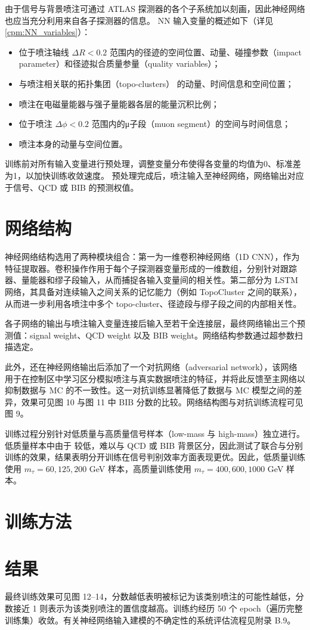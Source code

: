 由于信号与背景喷注可通过 ATLAS 探测器的各个子系统加以刻画，因此神经网络也应当充分利用来自各子探测器的信息。
NN 输入变量的概述如下（详见\autoref{cpm:NN_variables}）：
\begin{itemize}
    \item 位于喷注轴线 $\Delta R < 0.2$ 范围内的径迹的空间位置、动量、碰撞参数（impact parameter）和径迹拟合质量参量（quality variables）；
    \item 与喷注相关联的拓扑集团（topo-clusters） 的动量、时间信息和空间位置；
    \item 喷注在电磁量能器与强子量能器各层的能量沉积比例；
    \item 位于喷注 $\Delta \phi < 0.2$ 范围内的μ子段（muon segment）的空间与时间信息；
    \item 喷注本身的动量与空间位置。
\end{itemize}

训练前对所有输入变量进行预处理，调整变量分布使得各变量的均值为0、标准差为1，以加快训练收敛速度。
预处理完成后，喷注输入至神经网络，网络输出对应于信号、QCD 或 BIB 的预测权值。


\section{网络结构}
神经网络结构选用了两种模块组合：第一为一维卷积神经网络（1D CNN），作为特征提取器。卷积操作作用于每个子探测器变量形成的一维数组，分别针对跟踪器、量能器和缪子段输入，从而捕捉各输入变量间的相关性。第二部分为 LSTM 网络，其具备对连续输入之间关系的记忆能力（例如 TopoCluster 之间的联系），从而进一步利用各喷注中多个 topo-cluster、径迹段与缪子段之间的内部相关性。

各子网络的输出与喷注输入变量连接后输入至若干全连接层，最终网络输出三个预测值：signal weight、QCD weight 以及 BIB weight。网络结构参数通过超参数扫描选定。

此外，还在神经网络输出后添加了一个对抗网络（adversarial network），该网络用于在控制区中学习区分模拟喷注与真实数据喷注的特征，并将此反馈至主网络以抑制数据与 MC 的不一致性。这一对抗训练显著降低了数据与 MC 模型之间的差异，效果可见图 10 与图 11 中 BIB 分数的比较。网络结构图与对抗训练流程可见图 9。

训练过程分别针对低质量与高质量信号样本（low-mass 与 high-mass）独立进行。低质量样本中由于 \pt 较低，难以与 QCD 或 BIB 背景区分，因此测试了联合与分别训练的效果，结果表明分开训练在信号判别效率方面表现更优。因此，低质量训练使用 $m_\tau = 60, 125, 200$ GeV 样本，高质量训练使用 $m_\tau = 400, 600, 1000$ GeV 样本。


\section{训练方法}


\section{结果}
最终训练效果可见图 12--14，分数越低表明被标记为该类别喷注的可能性越低，分数接近 1 则表示为该类别喷注的置信度越高。训练约经历 50 个 epoch（遍历完整训练集）收敛。有关神经网络输入建模的不确定性的系统评估流程见附录 B.9。

